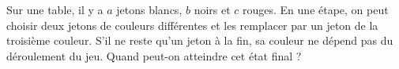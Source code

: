 Sur une table, il y a $a$ jetons blancs, $b$ noirs et $c$ rouges. En une étape, on peut choisir deux jetons de couleurs différentes et les remplacer par un jeton de la troisième couleur. S'il ne reste qu'un jeton à la fin, sa couleur ne dépend pas du déroulement du jeu. Quand peut-on atteindre cet état final ?
